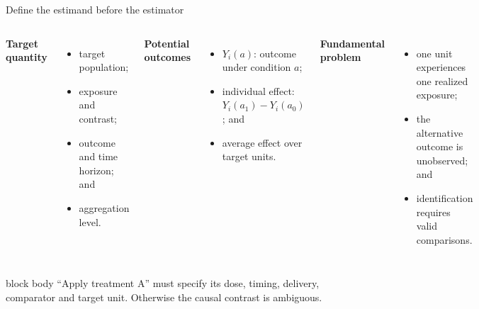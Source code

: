 \documentclass[10pt,aspectratio=169]{beamer}
\begin{document}
\begin{frame}{Define the estimand before the estimator}

\small

\begin{columns}[T]


\textbf{Target quantity}

\begin{itemize}
  \item target population;
  \item exposure and contrast;
  \item outcome and time horizon; and
  \item aggregation level.
\end{itemize}


\textbf{Potential outcomes}

\begin{itemize}
  \item $Y_i(a)$: outcome under condition $a$;
  \item individual effect: $Y_i(a_1)-Y_i(a_0)$; and
  \item average effect over target units.
\end{itemize}


\textbf{Fundamental problem}

\begin{itemize}
  \item one unit experiences one realized exposure;
  \item the alternative outcome is unobserved; and
  \item identification requires valid comparisons.
\end{itemize}

\end{columns}

\vspace{0.35cm}

\begin{beamercolorbox}[rounded=true,sep=8pt]{block body}
``Apply treatment A'' must specify its dose, timing, delivery, comparator and target unit. Otherwise the causal contrast is ambiguous.
\end{beamercolorbox}

\end{frame}
\end{document}
